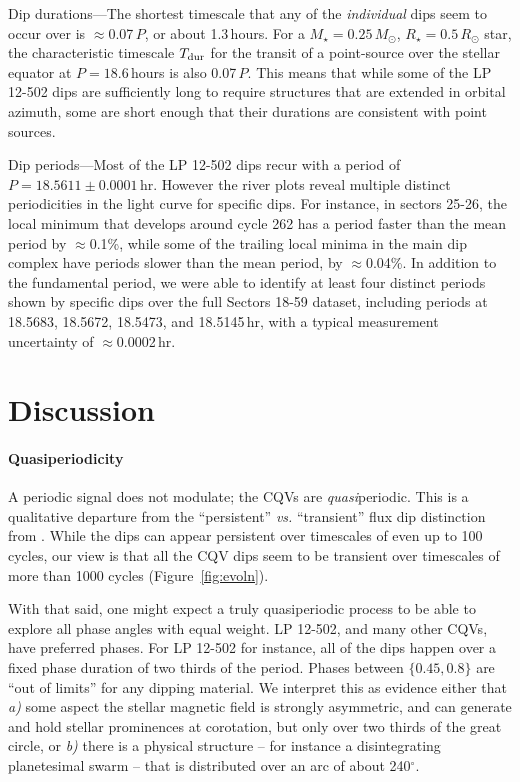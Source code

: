\documentclass[11pt,twocolumn,tighten]{aastex63}
\begin{document}
{\sc Dip durations}---The shortest timescale that any of the {\it
individual} dips seem to occur over is $\approx$0.07\,$P$, or about
1.3\,hours.  For a $M_\star=0.25\,M_\odot$, $R_\star=0.5\,R_\odot$
star, the characteristic timescale $T_{\rm dur}$ for the transit of a
point-source over the stellar equator at $P=18.6\,$hours is also
0.07\,$P$.  This means that while some of the LP 12-502 dips are
sufficiently long to require structures that are extended in orbital
azimuth, some are short enough that their durations are consistent
with point sources.

{\sc Dip periods}---Most of the LP 12-502 dips recur with a period of
$P=18.5611 \pm 0.0001$\,hr.  However the river plots reveal multiple
distinct periodicities in the light curve for specific dips.  For
instance, in sectors 25-26, the local minimum that develops around
cycle 262 has a period faster than the mean period by $\approx$0.1\%,
while some of the trailing local minima in the main dip complex have
periods slower than the mean period, by $\approx$0.04\%.  In addition
to the fundamental period, we were able to identify at least four
distinct periods shown by specific dips over the full Sectors 18-59
dataset, including periods at 18.5683, 18.5672, 18.5473, and
18.5145\,hr, with a typical measurement uncertainty of
$\approx$0.0002\,hr.




\section{Discussion}
\label{sec:discussion}

\paragraph{Quasiperiodicity}
A periodic signal does not modulate; the CQVs are {\it quasi}periodic.
This is a qualitative departure from
the ``persistent'' {\it vs.} ``transient'' flux dip distinction from 
\citet{2017AJ....153..152S}.  While the dips can appear persistent
over timescales of even up to 100 cycles, our view is that all the CQV
dips seem to be transient over timescales of more than 1000 cycles
(Figure~\ref{fig:evoln}).

With that said, one might expect a truly quasiperiodic process to be
able to explore all phase angles with equal weight.  LP 12-502, and
many other CQVs, have preferred phases.  For LP 12-502 for instance,
all of the dips happen over a fixed phase duration of two thirds of
the period.  Phases between $\{0.45,0.8\}$ are ``out of limits'' for
any dipping material.  We interpret this as evidence
either that {\it a)} some aspect the stellar magnetic field is
strongly asymmetric, and can generate and hold stellar prominences at
corotation, but only over two thirds of the great circle,
or {\it b)} there is a physical structure -- for instance a
disintegrating planetesimal swarm -- that is distributed over an arc
of about 240$^\circ$.
\end{document}

